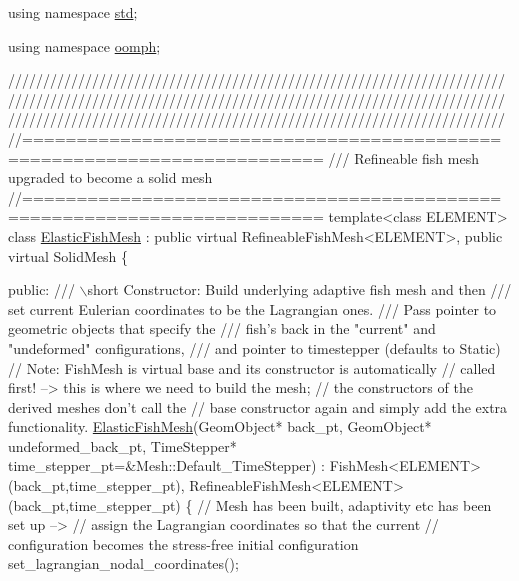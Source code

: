 \begin{DoxyCodeInclude}
\textcolor{keyword}{using namespace }\hyperlink{namespacestd}{std};

\textcolor{keyword}{using namespace }\hyperlink{namespaceoomph}{oomph};

\textcolor{comment}{}
\textcolor{comment}{///////////////////////////////////////////////////////////////////////}
\textcolor{comment}{///////////////////////////////////////////////////////////////////////}
\textcolor{comment}{///////////////////////////////////////////////////////////////////////}
\textcolor{comment}{}
\textcolor{comment}{//=========================================================================}\textcolor{comment}{}
\textcolor{comment}{/// Refineable fish mesh upgraded to become a solid mesh}
\textcolor{comment}{}\textcolor{comment}{//=========================================================================}
\textcolor{keyword}{template}<\textcolor{keyword}{class} ELEMENT>
\textcolor{keyword}{class }\hyperlink{classElasticFishMesh}{ElasticFishMesh} : \textcolor{keyword}{public} \textcolor{keyword}{virtual} RefineableFishMesh<ELEMENT>, 
                        \textcolor{keyword}{public} \textcolor{keyword}{virtual} SolidMesh 
\{

\textcolor{keyword}{public}:
\textcolor{comment}{}
\textcolor{comment}{ /// \(\backslash\)short Constructor: Build underlying adaptive fish mesh and then }
\textcolor{comment}{ /// set current Eulerian coordinates to be the Lagrangian ones.}
\textcolor{comment}{ /// Pass pointer to geometric objects that specify the }
\textcolor{comment}{ /// fish's back in the "current" and "undeformed" configurations,}
\textcolor{comment}{ /// and pointer to timestepper (defaults to Static)}
\textcolor{comment}{} \textcolor{comment}{// Note: FishMesh is virtual base and its constructor is automatically}
 \textcolor{comment}{// called first! --> this is where we need to build the mesh;}
 \textcolor{comment}{// the constructors of the derived meshes don't call the}
 \textcolor{comment}{// base constructor again and simply add the extra functionality.}
 \hyperlink{classElasticFishMesh}{ElasticFishMesh}(GeomObject* back\_pt, GeomObject* undeformed\_back\_pt, 
                 TimeStepper* time\_stepper\_pt=&Mesh::Default\_TimeStepper) : 
  FishMesh<ELEMENT>(back\_pt,time\_stepper\_pt), 
  RefineableFishMesh<ELEMENT>(back\_pt,time\_stepper\_pt)
  \{
   \textcolor{comment}{// Mesh has been built, adaptivity etc has been set up --> }
   \textcolor{comment}{// assign the Lagrangian coordinates so that the current}
   \textcolor{comment}{// configuration becomes the stress-free initial configuration }
   set\_lagrangian\_nodal\_coordinates();


\end{DoxyCodeInclude}
